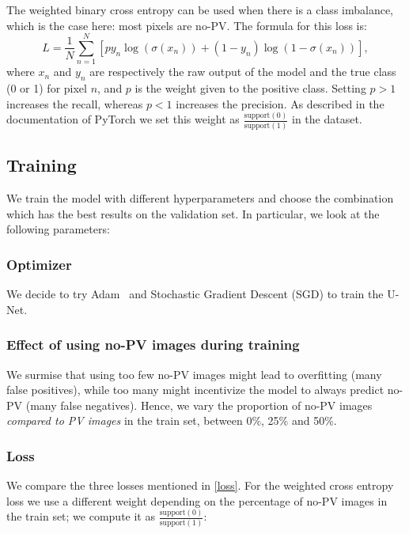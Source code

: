 \documentclass[10pt,conference]{IEEEtran}
\begin{document}
The weighted binary cross entropy can be used when there is a class imbalance, which is the case here:
most pixels are no-PV. 
The formula for this loss is:
\begin{equation*}
    L = \frac{1}{N} \sum_{n=1}^N  [py_n \log(\sigma(x_n))
        + (1-y_n) \log(1-\sigma(x_n))],
\end{equation*}
where $x_n$ and $y_n$ are respectively the raw output of the model and the true class (0 or 1) for pixel $n$,
and $p$ is the weight given to the positive class. 
Setting $p>1$ increases the recall, whereas $p<1$ increases the precision.
As described in the documentation of PyTorch we set this weight as
$\frac{\mathrm{support}(0)}{\mathrm{support}(1)}$
in the dataset.


\subsection{Training}
We train the model with different hyperparameters and choose the combination which has the best results on the validation set. In particular, we look at the following parameters:

\subsubsection{Optimizer}
We decide to try Adam~\cite{kingma2014adam} and Stochastic Gradient Descent (SGD) to train the U-Net.

\subsubsection{Effect of using no-PV images during training}
We surmise that using too few no-PV images might lead to overfitting (many false positives), while too many might incentivize the model to always predict no-PV (many false negatives).
Hence, we vary the proportion of no-PV images \textit{compared to PV images} in the train set, between 0\%, 25\% and 50\%.

\subsubsection{Loss}
We compare the three losses mentioned in \autoref{loss}.
For the weighted cross entropy loss we use a different weight depending on the percentage of no-PV images in the train set; we compute it as
$\frac{\mathrm{support}(0)}{\mathrm{support}(1)}$:
\end{document}
